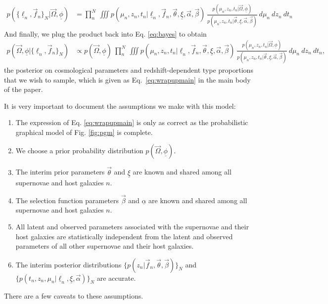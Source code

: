 \documentclass[12pt, twocolumn]{emulateapj}
\newcommand{\textul}{\underline}
\begin{document}
\begin{appendix}
\begin{align}
\label{eq:plugin}
p(\{\textul{\ell}_{n}, \vec{f}_{n}\}_{N} | \vec{\Omega}, \textul{\phi}) &= \prod_{n}^{N}\ \iiint p(\mu_{n}, z_{n}, t_{n} | \textul{\ell}_{n}, \vec{f}_{n}, \vec{\theta}, \textul{\xi}, \vec{\alpha}, \vec{\beta})\ \frac{p(\mu_{n}, z_{n}, t_{n} | \vec{\Omega}, \textul{\phi})}{p(\mu_{n}, z_{n}, t_{n} | \vec{\theta}, \textul{\xi}, \vec{\alpha}, \vec{\beta})}\ d\mu_{n}\ dz_{n}\ dt_{n}
\end{align}
And finally, we plug the product back into Eq. \ref{eq:bayes} to obtain
\begin{align}
\label{eq:wrapup}
p(\vec{\Omega}, \textul{\phi} | \{\textul{\ell}_{n}, \vec{f}_{n}\}_{N}) &\propto p(\vec{\Omega}, \textul{\phi})\ \prod_{n}^{N}\ \iiint p(\mu_{n}, z_{n}, t_{n} | \textul{\ell}_{n}, \vec{f}_{n}, \vec{\theta}, \textul{\xi}, \vec{\alpha}, \vec{\beta})\ \frac{p(\mu_{n}, z_{n}, t_{n} | \vec{\Omega}, \textul{\phi})}{p(\mu_{n}, z_{n}, t_{n} | \vec{\theta}, \textul{\xi}, \vec{\alpha}, \vec{\beta})}\ d\mu_{n}\ dz_{n}\ dt_{n},
\end{align}
the posterior on cosmological parameters and redshift-dependent type proportions that we wish to sample, which is given as Eq.~\ref{eq:wrapupmain} in the main body of the paper.



It is very important to document the assumptions we make with this model:
\begin{enumerate}
	\item\label{it:completeness} The expression of Eq. \ref{eq:wrapupmain} is only as correct as the probabilistic graphical model of Fig. \ref{fig:pgm} is complete.
	\item\label{it:prior} We choose a prior probability distribution $p(\vec{\Omega}, \textul{\phi})$.
	\item\label{it:interimpriors} The interim prior parameters $\vec{\theta}$ and $\textul{\xi}$ are known and shared among all supernovae and host galaxies $n$.
	\item\label{it:selectionfunctions} The selection function parameters $\vec{\beta}$ and $\textul{\alpha}$ are known and shared among all supernovae and host galaxies $n$.
	\item\label{it:independence} All latent and observed parameters associated with the supernovae and their host galaxies are statistically independent from the latent and observed parameters of all other supernovae and their host galaxies.
	\item\label{it:accuracy} The interim posterior distributions $\{p(z_{n} | \vec{f}_{n}, \vec{\theta}, \vec{\beta})\}_{N}$ and $\{p(t_{n}, z_{n}, \mu_{n} | \textul{\ell}_{n}, \textul{\xi}, \vec{\alpha})\}_{N}$ are accurate.
\end{enumerate}
There are a few caveats to these assumptions.  


\end{appendix}
\end{document}

